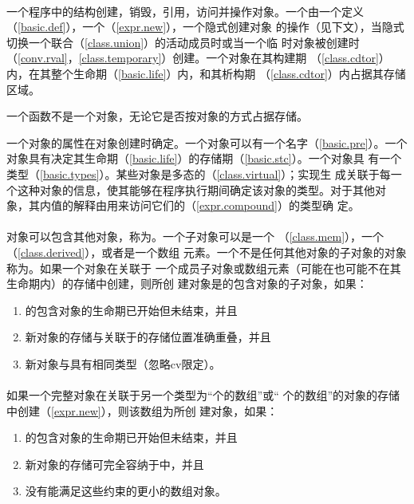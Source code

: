 \paragraph{} %
一个\cpp{}程序中的结构创建，销毁，引用，访问并操作对象。一个由一个定义
（\ref{basic.def}），一个（\ref{expr.new}），一个隐式创建对象
的操作（见下文），当隐式切换一个联合（\ref{class.union}）的活动成员时或当一个临
时对象被创建时（\ref{conv.rval}，\ref{class.temporary}）创建。一个对象在其构建期
（\ref{class.cdtor}）内，在其整个生命期（\ref{basic.life}）内，和其析构期
（\ref{class.cdtor}）内占据其存储区域。

\begin{note}
  一个函数不是一个对象，无论它是否按对象的方式占据存储。
\end{note}

一个对象的属性在对象创建时确定。一个对象可以有一个名字（\ref{basic.pre}）。一个
对象具有决定其生命期（\ref{basic.life}）的存储期（\ref{basic.stc}）。一个对象具
有一个类型（\ref{basic.types}）。某些对象是多态的（\ref{class.virtual}）；实现生
成关联于每一个这种对象的信息，使其能够在程序执行期间确定该对象的类型。对于其他对
象，其内值的解释由用来访问它们的（\ref{expr.compound}）的类型确
定。

\paragraph{} %
对象可以包含其他对象，称为。一个子对象可以是一个
（\ref{class.mem}），一个（\ref{class.derived}），或者是一个数组
元素。一个不是任何其他对象的子对象的对象称为。如果一个对象在关联于
一个成员子对象或数组元素（可能在也可能不在其生命期内）的存储中创建，则所创
建对象是的包含对象的子对象，如果：
\begin{enumerate}
  \item {}的包含对象的生命期已开始但未结束，并且
  \item 新对象的存储与关联于的存储位置准确重叠，并且
  \item 新对象与具有相同类型（忽略cv限定）。
\end{enumerate}

\paragraph{} %
如果一个完整对象在关联于另一个类型为“个的数组”或“
个的数组”的对象的存储中创建（\ref{expr.new}），则该数组为所创
建对象，如果：
\begin{enumerate}
  \item {}的包含对象的生命期已开始但未结束，并且
  \item 新对象的存储可完全容纳于中，并且
  \item 没有能满足这些约束的更小的数组对象。
\end{enumerate}

